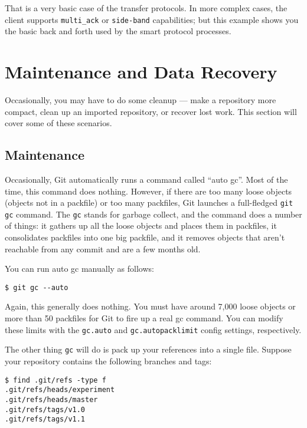 \documentclass[a4paper]{book}
\begin{document}
That is a very basic case of the transfer protocols. In more complex cases, the client supports \texttt{multi\_ack} or \texttt{side-band} capabilities; but this example shows you the basic back and forth used by the smart protocol processes.

\section{Maintenance and Data Recovery}

Occasionally, you may have to do some cleanup --- make a repository more compact, clean up an imported repository, or recover lost work. This section will cover some of these scenarios.

\subsection{Maintenance}

Occasionally, Git automatically runs a command called “auto gc”. Most of the time, this command does nothing. However, if there are too many loose objects (objects not in a packfile) or too many packfiles, Git launches a full-fledged \texttt{git gc} command. The \texttt{gc} stands for garbage collect, and the command does a number of things: it gathers up all the loose objects and places them in packfiles, it consolidates packfiles into one big packfile, and it removes objects that aren't reachable from any commit and are a few months old.

You can run auto gc manually as follows:

\begin{shaded}\begin{verbatim}
$ git gc --auto
\end{verbatim}\end{shaded}

Again, this generally does nothing. You must have around 7,000 loose objects or more than 50 packfiles for Git to fire up a real gc command. You can modify these limits with the \texttt{gc.auto} and \texttt{gc.autopacklimit} config settings, respectively.

The other thing \texttt{gc} will do is pack up your references into a single file. Suppose your repository contains the following branches and tags:

\begin{shaded}\begin{verbatim}
$ find .git/refs -type f
.git/refs/heads/experiment
.git/refs/heads/master
.git/refs/tags/v1.0
.git/refs/tags/v1.1
\end{verbatim}\end{shaded}
\end{document}
